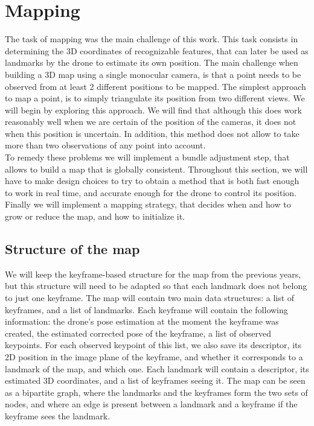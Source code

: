 \chapter{Mapping} %
The task of mapping was the main challenge of this work. This task consists in determining the 3D coordinates of recognizable features, that can later be used as landmarks by the drone to estimate its own position. The main challenge when building a 3D map using a single monocular camera, is that a point needs to be observed from at least 2 different positions to be mapped. The simplest approach to map a point, is to simply triangulate its position from two different views. We will begin by exploring this approach. We will find that although this does work reasonably well when we are certain of the position of the cameras, it does not when this position is uncertain. In addition, this method does not allow to take more than two observations of any point into account.\\

To remedy these problems we will implement a bundle adjustment step, that allows to build a map that is globally consistent. Throughout this section, we will have to make design choices to try to obtain a method that is both fast enough to work in real time, and accurate enough for the drone to control its position.\\

Finally we will implement a mapping strategy, that decides when and how to grow or reduce the map, and how to initialize it.

\section{Structure of the map}
We will keep the keyframe-based structure for the map from the previous years, but this structure will need to be adapted so that each landmark does not belong to just one keyframe. The map will contain two main data structures: a list of keyframes, and a list of landmarks. Each keyframe will contain the following information: the drone's pose estimation at the moment the keyframe was created, the estimated corrected pose of the keyframe, a list of observed keypoints. For each observed keypoint of this list, we also save its descriptor, its 2D position in the image plane of the keyframe, and whether it corresponds to a landmark of the map, and which one. Each landmark will contain a descriptor, its estimated 3D coordinates, and a list of keyframes seeing it. The map can be seen as a bipartite graph, where the landmarks and the keyframes form the two sets of nodes, and where an edge is present between a landmark and a keyframe if the keyframe sees the landmark.\\

